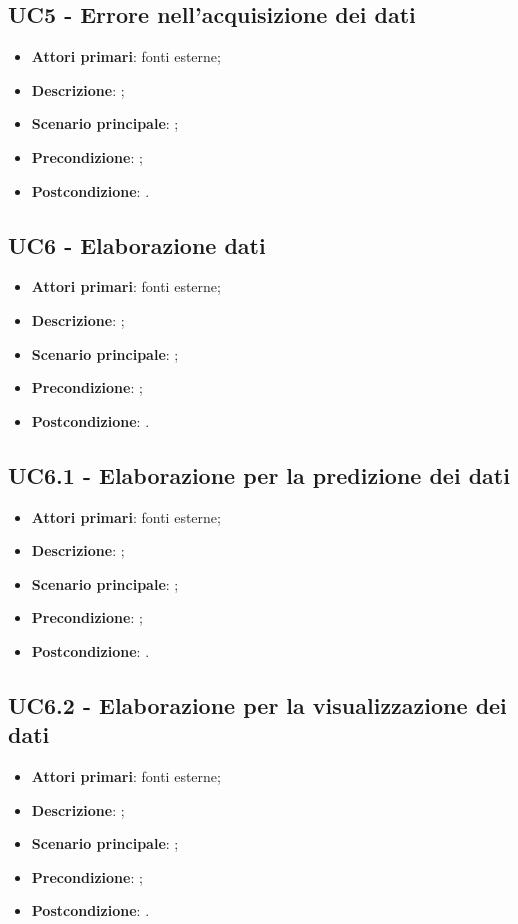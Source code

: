 \subsection{UC5 - Errore nell'acquisizione dei dati}
\begin{itemize}
\item \textbf{Attori primari}: fonti esterne;
\item \textbf{Descrizione}: ;
\item \textbf{Scenario principale}: ;
\item \textbf{Precondizione}: ;
\item \textbf{Postcondizione}: .
\end{itemize}

\subsection{UC6 - Elaborazione dati}
\begin{itemize}
	\item \textbf{Attori primari}: fonti esterne;
	\item \textbf{Descrizione}: ;
	\item \textbf{Scenario principale}: ;
	\item \textbf{Precondizione}: ;
	\item \textbf{Postcondizione}: .
\end{itemize}

\subsection{UC6.1 - Elaborazione per la predizione dei dati}
\begin{itemize}
	\item \textbf{Attori primari}: fonti esterne;
	\item \textbf{Descrizione}: ;
	\item \textbf{Scenario principale}: ;
	\item \textbf{Precondizione}: ;
	\item \textbf{Postcondizione}: .
\end{itemize}

\subsection{UC6.2 - Elaborazione per la visualizzazione dei dati}
\begin{itemize}
	\item \textbf{Attori primari}: fonti esterne;
	\item \textbf{Descrizione}: ;
	\item \textbf{Scenario principale}: ;
	\item \textbf{Precondizione}: ;
	\item \textbf{Postcondizione}: .
\end{itemize}

